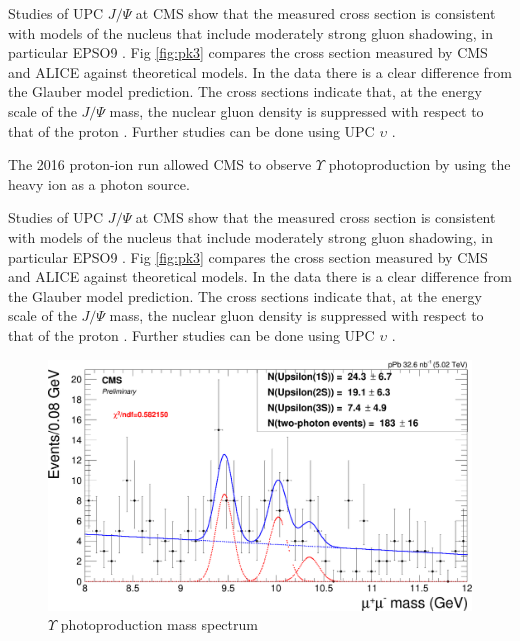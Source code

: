 Studies of UPC $J/\Psi$ at CMS show that the measured cross section is consistent with models of the nucleus that include moderately strong gluon shadowing, in particular EPSO9 \cite{lta2013.05}\cite{Eskola:2009uj}. Fig \ref{fig:pk3} compares the cross section measured by CMS and ALICE against theoretical models. In the data there is a clear difference from the Glauber model prediction. The cross sections indicate that, at the energy scale of the $J/\Psi$ mass, the nuclear gluon density is suppressed with respect to that of the proton \cite{Frankfurt:2011cs}. Further studies can be done using UPC $\upsilon$ \cite{pQCD2013.02}\cite{Cisek:2012yt}. 

The 2016 proton-ion run allowed CMS to observe $\Upsilon$ photoproduction by using the heavy ion as a photon source. 

Studies of UPC $J/\Psi$ at CMS show that the measured cross section is consistent with models of the nucleus that include moderately strong gluon shadowing, in particular EPSO9 \cite{lta2013.05}\cite{Eskola:2009uj}. Fig \ref{fig:pk3} compares the cross section measured by CMS and ALICE against theoretical models. In the data there is a clear difference from the Glauber model prediction. The cross sections indicate that, at the energy scale of the $J/\Psi$ mass, the nuclear gluon density is suppressed with respect to that of the proton \cite{Frankfurt:2011cs}. Further studies can be done using UPC $\upsilon$ \cite{pQCD2013.02}\cite{Cisek:2012yt}.
 
\begin{figure}[h!]
\begin{centering}
\includegraphics[width=4.5in]{Chapter2/importfigs/ruchi_mass.png}
\par\end{centering}
\caption{$\Upsilon$ photoproduction mass spectrum \cite{Chudasama:2016eck} \label{fig:ruchiMass}}
\end{figure}

